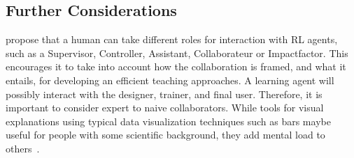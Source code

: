 \documentclass[twoside,11pt]{article}
\begin{document}




\subsection{Further Considerations}
\citet{WuEtAl:2021:HITLMLSurvey} propose that a human can take different roles for interaction with RL agents, such as a Supervisor, Controller, Assistant, Collaborateur or Impactfactor. This encourages it to take into account how the collaboration is framed, and what it entails, for developing an efficient teaching approaches. A learning agent will possibly interact with the designer, trainer, and final user. Therefore, it is important to consider expert to naive collaborators. While tools for visual explanations using typical data visualization techniques such as bars maybe useful for people with some scientific background, they add mental load to others~\citep{anderson:20}. 
\end{document}

